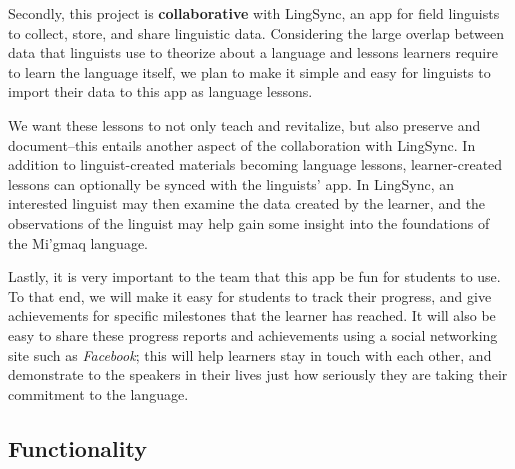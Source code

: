 \documentclass[12pt]{article} %
\begin{document}
Secondly, this project is {\bf collaborative} with LingSync, an app for field linguists to collect, store, and share linguistic data. Considering the large overlap between data that linguists use to theorize about a language and lessons learners require to learn the language itself, we plan to make it simple and easy for linguists to import their data to this app as language lessons.

We want these lessons to not only teach and revitalize, but also preserve and document--this entails another aspect of the collaboration with LingSync. In addition to linguist-created materials becoming language lessons, learner-created lessons can optionally be synced with the linguists' app. In LingSync, an interested linguist may then examine the data created by the learner, and the observations of the linguist may help gain some insight into the foundations of the Mi'gmaq language.

Lastly, it is very important to the team that this app be fun for students to use. To that end, we will make it easy for students to track their progress, and give achievements for specific milestones that the learner has reached. It will also be easy to share these progress reports and achievements using a social networking site such as {\it Facebook}; this will help learners stay in touch with each other, and demonstrate to the speakers in their lives just how seriously they are taking their commitment to the language.

\subsection{Functionality}
	
\end{document}

